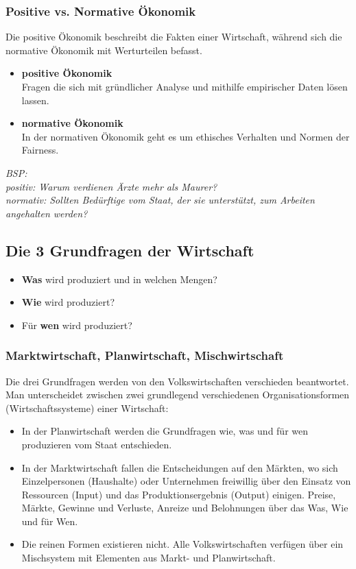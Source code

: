 \documentclass[10pt]{scrartcl}
\begin{document}
\subsubsection{Positive vs. Normative Ökonomik}
Die positive Ökonomik beschreibt die Fakten einer Wirtschaft, während sich die normative Ökonomik mit Werturteilen befasst.\\
\begin{itemize}
\item {\bf positive Ökonomik}\\
Fragen die sich mit gründlicher Analyse und mithilfe empirischer Daten lösen lassen.
\item {\bf normative Ökonomik}\\
In der normativen Ökonomik geht es um ethisches Verhalten und Normen der Fairness.

\end{itemize}
{\it 
BSP:\\
positiv: Warum verdienen Ärzte mehr als Maurer?\\
normativ: Sollten Bedürftige vom Staat, der sie unterstützt, zum Arbeiten angehalten werden?\\}
\subsection{Die 3 Grundfragen der Wirtschaft}
\begin{itemize}
\item {\bf Was} wird produziert und in welchen Mengen? 
\item {\bf Wie} wird produziert?
\item Für {\bf wen} wird produziert?
\end{itemize}
\subsubsection{ Marktwirtschaft, Planwirtschaft, Mischwirtschaft}
Die drei Grundfragen werden von den Volkswirtschaften verschieden
beantwortet.\\
Man unterscheidet zwischen zwei grundlegend verschiedenen Organisationsformen (Wirtschaftssysteme) einer Wirtschaft:
\begin{itemize}
\item In der Planwirtschaft werden die Grundfragen wie, was und für wen produzieren vom Staat entschieden.
\item In der Marktwirtschaft fallen die Entscheidungen auf den Märkten, wo sich Einzelpersonen (Haushalte) oder Unternehmen freiwillig über den Einsatz von Ressourcen (Input) und das Produktionsergebnis (Output) einigen. Preise, Märkte, Gewinne und Verluste, Anreize und Belohnungen über das Was, Wie und für Wen.
\item Die reinen Formen existieren nicht. Alle Volkswirtschaften verfügen über ein Mischsystem mit Elementen aus Markt- und Planwirtschaft.
\end{itemize}
\end{document}

